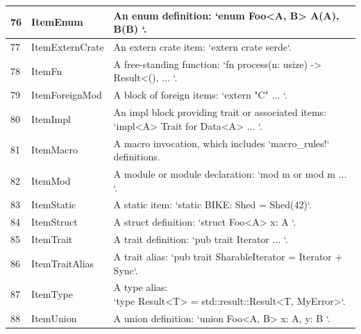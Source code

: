 \begin{longtable}{| p{} | p{} | p{} |}
76    & ItemEnum                       & An enum definition: `enum Foo<A, B> { A(A), B(B) }`.                                                           \\ \hline
77    & ItemExternCrate                & An extern crate item: `extern crate serde`.                                                                    \\ \hline
78    & ItemFn                         & A free-standing function: `fn process(n: usize) -> Result<(), { ... }`.                                          \\ \hline
79    & ItemForeignMod                 & A block of foreign items: `extern "C" { ... }`.                                                                \\ \hline
80    & ItemImpl                       & \makecell{An impl block providing trait or associated items: \\ `impl<A> Trait for Data<A> { ... }`.}                        \\ \hline
81    & ItemMacro                      & A macro invocation, which includes `macro\_rules!` definitions.                                                 \\ \hline
82    & ItemMod                        & A module or module declaration: `mod m or mod m { ... }`.                                                      \\ \hline
83    & ItemStatic                     & A static item: `static BIKE: Shed = Shed(42)`.                                                                 \\ \hline
84    & ItemStruct                     & A struct definition: `struct Foo<A> { x: A }`.                                                                 \\ \hline
85    & ItemTrait                      & A trait definition: `pub trait Iterator { ... }`.                                                              \\ \hline
86    & ItemTraitAlias                 & A trait alias: `pub trait SharableIterator = Iterator + Sync`.                                                 \\ \hline
87    & ItemType                       & \makecell{A type alias: \\ `type Result<T> = std::result::Result<T, MyError>`.}                                              \\ \hline
88    & ItemUnion                      & A union definition: `union Foo<A, B> { x: A, y: B }`.                                                          \\ \hline

\end{longtable}
